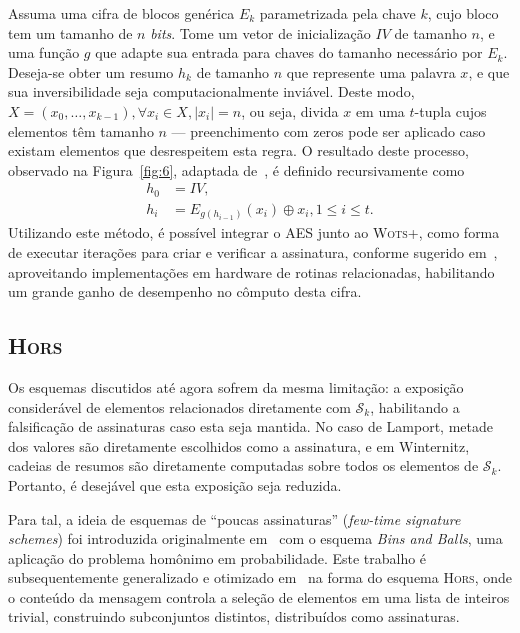 \documentclass{ufsctex/ufsctex}
\newcommand{\sk}{\mathcal{S}_k}
\newcommand{\length}[1]{\vert{} #1 \vert{}}
\newcommand{\wotsplus}{\textsc{Wots+}}
\newcommand{\hors}{\textsc{Hors}}
\begin{document}
Assuma uma cifra de blocos genérica $E_{k}$ parametrizada pela chave $k$, cujo
bloco tem um tamanho de $n$ \emph{bits}. Tome um vetor de inicialização $IV$ de
tamanho $n$, e uma função $g$ que adapte sua entrada para chaves do tamanho
necessário por $E_{k}$. Deseja-se obter um resumo $h_k$ de tamanho $n$ que
represente uma palavra $x$, e que sua inversibilidade seja computacionalmente
inviável. Deste modo, $X = (x_0, \dots, x_{k - 1}), \forall x_i \in X,
\length{x_i} = n$, ou seja, divida $x$ em uma $t$-tupla cujos elementos têm
tamanho $n$ --- preenchimento com zeros pode ser aplicado caso existam
elementos que desrespeitem esta regra. O resultado deste processo, observado na
Figura~\ref{fig:6}, adaptada de~\cite{TikZ:for:Cryptographers}, é definido
recursivamente como
\begin{equation}
  \begin{split}
    h_0 &= IV, \\
    h_i &= E_{g(h_{i-1})}(x_i) \oplus x_i, 1 \leq i \leq t.
  \end{split}
\end{equation}
Utilizando este método, é possível integrar o AES junto ao \wotsplus{}, como
forma de executar iterações para criar e verificar a assinatura, conforme
sugerido em~\cite[4.1]{Hlsing2013}, aproveitando implementações em hardware de
rotinas relacionadas, habilitando um grande ganho de desempenho no cômputo
desta cifra.

\subsection{\hors{}}\label{subsection:hors}

Os esquemas discutidos até agora sofrem da mesma limitação: a exposição
considerável de elementos relacionados diretamente com $\sk{}$, habilitando a
falsificação de assinaturas caso esta seja mantida. No caso de Lamport, metade
dos valores são diretamente escolhidos como a assinatura, e em Winternitz,
cadeias de resumos são diretamente computadas sobre todos os elementos de
$\sk{}$. Portanto, é desejável que esta exposição seja reduzida.

Para tal, a ideia de esquemas de ``poucas assinaturas'' (\emph{few-time
signature schemes}) foi introduzida originalmente
em~\cite{Perrig:2001:BOS:501983.501988} com o esquema \emph{Bins and Balls},
uma aplicação do problema homônimo em probabilidade. Este trabalho é
subsequentemente generalizado e otimizado
em~\cite{Reyzin:2002:BBS:646039.678322} na forma do esquema
\hors{}\sigla{\hors{}}{\emph{Hash to Obtain Random Subset}}, onde o conteúdo
da mensagem controla a seleção de elementos em uma lista de inteiros trivial,
construindo subconjuntos distintos, distribuídos como assinaturas.
\end{document}
